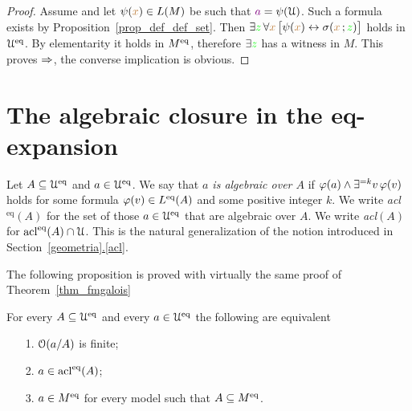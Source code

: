 \documentclass[creche.tex]{subfiles}
\begin{document}
\begin{proof}
Assume  and let $\psi({\color{brown} x})\in L(M)$ be such that ${\color{violet} a}=\psi(\EuScript U)$. Such a formula exists by Proposition~\ref{prop_def_def_set}. Then $\exists{\color{green}z}\,\forall{\color{brown}x}\,\big[\psi({\color{brown} x})\leftrightarrow\sigma({\color{brown} x}\,;{\color{green} z})\big]$ holds in $\EuScript U^{{\rm eq}}$. By elementarity it holds in $M^{{\rm eq}}$, therefore $\exists{\color{green}z}$ has a witness in $M$. This proves $\Rightarrow$, the converse implication is obvious.
\end{proof}

\section{The algebraic closure in the eq-expansion}

Let $A\subseteq\EuScript U^{{\rm eq}}$ and $a\in\EuScript U^{{\rm eq}}$. We say that \emph{$a$ is algebraic over $A$\/} if $\varphi(a)\wedge\exists^{=k}v\,\varphi(v)$ holds for some formula $\varphi(v)\in L^{{\rm eq}}(A)$ and some positive integer $k$. We write \emph{acl$^\textrm{eq}(A)$\/} for the set of those $a\in\EuScript U^{{\rm eq}}$ that are algebraic over $A$. We write \emph{acl$(A)$\/} for $\mathop{\rm acl}^{{\rm eq}}(A)\cap\EuScript U$. This is the natural generalization of the notion introduced in Section~\hyperref[acl]{\ref*{geometria}.\ref*{acl}}.


The following proposition is proved with virtually the same proof of Theorem~\ref{thm_fmgalois}

\begin{theorem}\label{thm_Galois_alg=alg}
For every $A\subseteq\EuScript U^{{\rm eq}}$ and every $a\in\EuScript U^{{\rm eq}}$ the following are equivalent
\begin{itemize}
\item[1.] $\EuScript O(a/A)$ is finite;
\item[2.] $a\in\mathop{\rm acl}^{{\rm eq}}(A)$;
\item[3.] $a\in M^{{\rm eq}}$ for every model such that $A\subseteq M^{{\rm eq}}$.\QED
\end{itemize}
\end{theorem}
\end{document}
